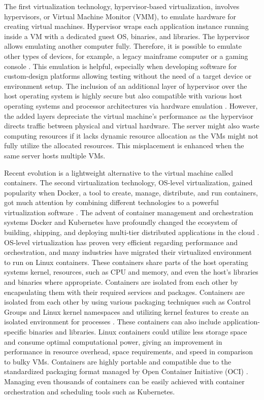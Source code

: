 The first virtualization technology, hypervisor-based virtualization, involves hypervisors, or Virtual Machine Monitor (VMM), to emulate hardware for creating virtual machines. Hypervisor wraps each application instance running inside a VM with a dedicated guest OS, binaries, and libraries. The hypervisor allows emulating another computer fully. Therefore, it is possible to emulate other types of devices, for example, a legacy mainframe computer or a gaming console \cite{Eder2016}. This emulation is helpful, especially when developing software for custom-design platforms allowing testing without the need of a target device or environment setup. The inclusion of an additional layer of hypervisor over the host operating system is highly secure but also compatible with various host operating systems and processor architectures via hardware emulation \cite{Lingayat2018}. However, the added layers depreciate the virtual machine's performance as the hypervisor directs traffic between physical and virtual hardware. The server might also waste computing resources if it lacks dynamic resource allocation as the VMs might not fully utilize the allocated resources. This misplacement is enhanced when the same server hosts multiple VMs.

Recent evolution is a lightweight alternative to the virtual machine called containers. The second virtualization technology, OS-level virtualization, gained popularity when Docker, a tool to create, manage, distribute, and run containers, got much attention by combining different technologies to a powerful virtualization software \cite{Eder2016}. The advent of container management and orchestration systems Docker and Kubernetes have profoundly changed the ecosystem of building, shipping, and deploying multi-tier distributed applications in the cloud \cite{Gao2017}. OS-level virtualization has proven very efficient regarding performance and orchestration, and many industries have migrated their virtualized environment to run on Linux containers. These containers share parts of the host operating systems kernel, resources, such as CPU and memory, and even the host's libraries and binaries where appropriate. Containers are isolated from each other by encapsulating them with their required services and packages. Containers are isolated from each other by using various packaging techniques such as Control Groups and Linux kernel namespaces and utilizing kernel features to create an isolated environment for processes \cite{Flauzac2020}. These containers can also include application-specific binaries and libraries. Linux containers could utilize less storage space and consume optimal computational power, giving an improvement in performance in resource overhead, space requirements, and speed \cite{Lingayat2018}\cite{Toimela2017} in comparison to bulky VMs. Containers are highly portable and compatible due to the standardized packaging format managed by Open Container Initiative (OCI) \cite{OCI}. Managing even thousands of containers can be easily achieved with container orchestration and scheduling tools such as Kubernetes.

